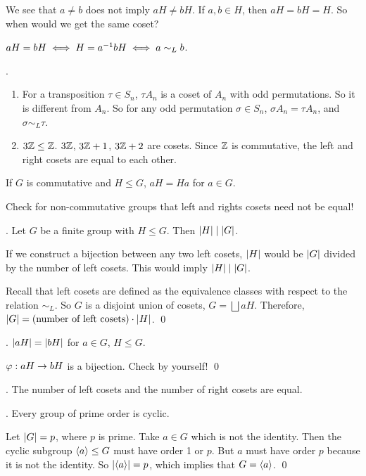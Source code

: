We see that \(a \neq b\) does not imply \(aH \neq bH\). If \(a, b\in H\), then \(aH = bH = H\). So when would we get the same coset?

\rmk\(aH = bH \iff H = a^{-1} b H \iff a \sim_L b\).

\ex.
\begin{enumerate}
    \item For a transposition \(\tau \in S_n\), \(\tau A_n\) is a coset of \(A_n\) with odd permutations. So it is different from \(A_n\). So for any odd permutation \(\sigma \in S_n\), \(\sigma A_n = \tau A_n\), and \(\sigma \sim_L \tau\).
    \item \(3\mathbb{Z} \leq \mathbb{Z}\). \(3\mathbb{Z}\), \(3\mathbb{Z} + 1\), \(3\mathbb{Z} + 2\) are cosets. Since \(\mathbb{Z}\) is commutative, the left and right cosets are equal to each other.
\end{enumerate}

\rmk If \(G\) is commutative and \(H \leq G\), \(aH = Ha\) for \(a \in G\).

Check for non-commutative groups that left and rights cosets need not be equal!

\medskip

\thm.  Let \(G\) be a finite group with \(H \leq G\). Then \(\left| H \right| \mid \left| G \right|\).

\pf If we construct a bijection between any two left cosets, \(\left| H \right|\) would be \(\left| G \right|\) divided by the number of left cosets. This would imply \(\left| H \right| \mid \left| G \right|\).

Recall that left cosets are defined as the equivalence classes with respect to the relation \(\sim_L\). So \(G\) is a disjoint union of cosets, \(G = \bigsqcup aH\). Therefore, \(\left| G \right| = \text{(number of left cosets)} \cdot \left| H \right|\). \qed

\lemma. \(\left| aH \right| = \left| bH \right|\) for \(a \in G\), \(H \leq G\).

\pf \(\varphi : aH \rightarrow bH\) is a bijection. Check by yourself! \qed

\cor. The number of left cosets and the number of right cosets are equal.

\medskip

\cor. Every group of prime order is cyclic.

\pf Let \(\left| G \right| = p\), where \(p\) is prime. Take \(a \in G\) which is not the identity. Then the cyclic subgroup \(\left\langle a \right\rangle \leq G\) must have order 1 or \(p\). But \(a\) must have order \(p\) because it is not the identity. So \(\left| \left\langle a \right\rangle \right| = p\), which implies that \(G = \left\langle a \right\rangle\). \qed

